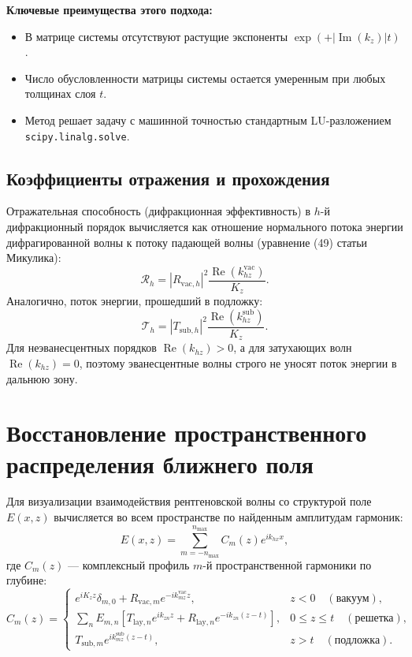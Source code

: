 \documentclass[a4paper,11pt]{article}
\begin{document}
\textbf{Ключевые преимущества этого подхода:}
\begin{itemize}
    \item В матрице системы отсутствуют растущие экспоненты $\exp(+|\operatorname{Im}(k_z)|t)$.
    \item Число обусловленности матрицы системы остается умеренным при любых толщинах слоя $t$.
    \item Метод решает задачу с машинной точностью стандартным LU-разложением \texttt{scipy.linalg.solve}.
\end{itemize}

\subsection{Коэффициенты отражения и прохождения}
Отражательная способность (дифракционная эффективность) в $h$-й дифракционный порядок вычисляется как отношение нормального потока энергии дифрагированной волны к потоку падающей волны (уравнение (49) статьи Микулика):
\begin{equation}
\mathcal{R}_h = |R_{\text{vac}, h}|^2 \frac{\operatorname{Re}(k_{hz}^{\text{vac}})}{K_z}.
\label{eq:refl_formula}
\end{equation}
Аналогично, поток энергии, прошедший в подложку:
\begin{equation}
\mathcal{T}_h = |T_{\text{sub}, h}|^2 \frac{\operatorname{Re}(k_{hz}^{\text{sub}})}{K_z}.
\end{equation}
Для неэванесцентных порядков $\operatorname{Re}(k_{hz}) > 0$, а для затухающих волн $\operatorname{Re}(k_{hz}) = 0$, поэтому эванесцентные волны строго не уносят поток энергии в дальнюю зону.

\section{Восстановление пространственного распределения ближнего поля}

Для визуализации взаимодействия рентгеновской волны со структурой поле $E(x, z)$ вычисляется во всем пространстве по найденным амплитудам гармоник:
\begin{equation}
E(x, z) = \sum_{m=-n_{\max}}^{n_{\max}} C_m(z) e^{i k_{hx} x},
\end{equation}
где $C_m(z)$ --- комплексный профиль $m$-й пространственной гармоники по глубине:
\begin{equation}
C_m(z) = \begin{cases}
e^{i K_z z} \delta_{m,0} + R_{\text{vac}, m} e^{-i k_{mz}^{\text{vac}} z}, & z < 0 \quad (\text{вакуум}), \\[2mm]
\sum_{n} E_{m,n} \left[ T_{\text{lay}, n} e^{i k_{zn} z} + R_{\text{lay}, n} e^{-i k_{zn} (z - t)} \right], & 0 \le z \le t \quad (\text{решетка}), \\[2mm]
T_{\text{sub}, m} e^{i k_{mz}^{\text{sub}} (z - t)}, & z > t \quad (\text{подложка}).
\end{cases}
\label{eq:field_reconstruction}
\end{equation}
\end{document}
